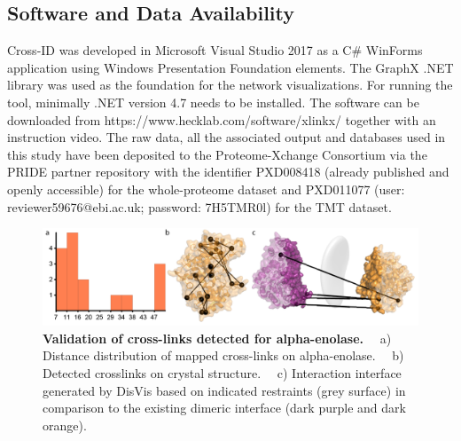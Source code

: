 \subsection{Software and Data Availability}
Cross-ID was developed in Microsoft Visual Studio 2017 as a C\# WinForms application using Windows Presentation Foundation elements. The GraphX .NET library was used as the foundation for the network visualizations. For running the tool, minimally .NET version 4.7 needs to be installed. The software can be downloaded from https://www.hecklab.com/software/xlinkx/ together with an instruction video. The raw data, all the associated output and databases used in this study have been deposited to the Proteome-Xchange Consortium \cite{vizcaíno2014proteomexchange} via the PRIDE partner repository with the identifier PXD008418 (already published and openly accessible) for the whole-proteome dataset and PXD011077 (user: reviewer59676@ebi.ac.uk; password: 7H5TMR0l) for the TMT dataset.
\begin{figure}[!htb]
  \center
  \includegraphics[]{Chapter.2/Figures/f4.png}
  \caption{
    \textbf{Validation of cross-links detected for alpha-enolase.} ~~a) Distance distribution of mapped cross-links on alpha-enolase. ~~b) Detected crosslinks on crystal structure. ~~c) Interaction interface generated by DisVis based on indicated restraints (grey surface) in comparison to the existing dimeric interface (dark purple and dark orange).
  }
  \label{fig:fig2.4}
\end{figure}
